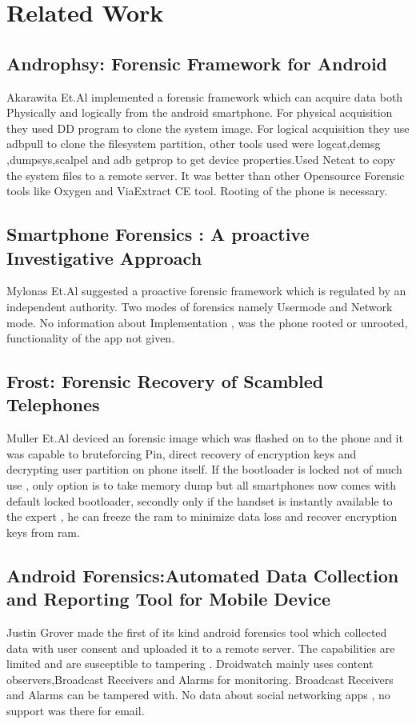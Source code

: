 \let\textcircled=\pgftextcircled
\chapter{Related Work}
\label{chap:lit_review}
\section{Androphsy: Forensic Framework for Android  }

Akarawita Et.Al\cite{akarawita_perera_atukorale_2015} implemented a forensic framework which can acquire data both 
Physically and logically from the android smartphone. For physical acquisition they 
used DD program to clone the system image. For logical acquisition they use adbpull 
to clone the filesystem partition, other tools used were logcat,demsg ,dumpsys,scalpel 
and adb getprop to get device properties.Used Netcat to copy the system files to a 
remote server. It was better than other Opensource Forensic tools like Oxygen and 
ViaExtract CE tool. Rooting of the phone is necessary.

\section{Smartphone Forensics : A proactive Investigative Approach}
Mylonas Et.Al\cite{mylonas_meletiadis_tsoumas_mitrou_gritzalis_2012} suggested a proactive forensic framework which is regulated by an 
independent authority. Two modes of forensics namely Usermode and Network 
mode. No information about Implementation , was the phone rooted or unrooted, 
functionality of the app not given. 

\section{Frost: Forensic Recovery of Scambled Telephones  }
Muller Et.Al\cite{Muller:2013:FFR:2524523.2524555} deviced an forensic image which was flashed on to the phone and it was 
capable to bruteforcing Pin, direct recovery of encryption keys and decrypting user 
partition on phone itself. If the bootloader is locked not of much use , only option is 
to take memory dump but all smartphones now comes with default locked bootloader, secondly only if the handset is instantly available to the expert , he can freeze the ram to minimize 
data loss and recover encryption keys from ram.

\section{Android Forensics:Automated Data Collection and Reporting Tool for Mobile Device }
Justin Grover\cite{grover_2013} made the first of its kind android forensics tool which collected data with user consent and uploaded it to a remote server. The capabilities are limited and are susceptible to tampering . Droidwatch mainly uses content observers,Broadcast Receivers and Alarms for monitoring. Broadcast Receivers and Alarms can be tampered with. No data about social networking apps , no support was there for email. 



